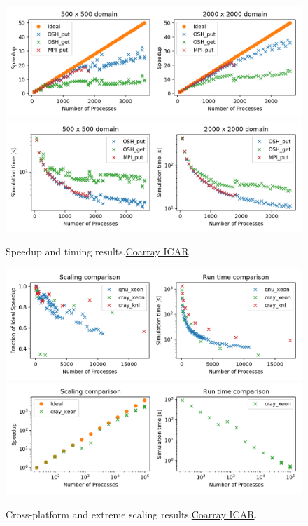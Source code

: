 \begin{figure}[p]
  \includegraphics[width=\textwidth]{figures/fig1_speedup.png}
  \includegraphics[width=\textwidth]{figures/fig2_timing.png}
  \caption{Speedup and timing results.\href{https://github.com/gutmann/coarray_icar}{Coarray ICAR}.\label{fig1-2}}
\end{figure}

\begin{figure}[p]
  \includegraphics[width=\textwidth]{figures/fig3_cross_platform.png}
  \includegraphics[width=\textwidth]{figures/fig4_extreme_scaling.png}
   \caption{Cross-platform and extreme scaling results.\href{https://github.com/gutmann/coarray_icar}{Coarray ICAR}.\label{fig3-4}}
\end{figure}

